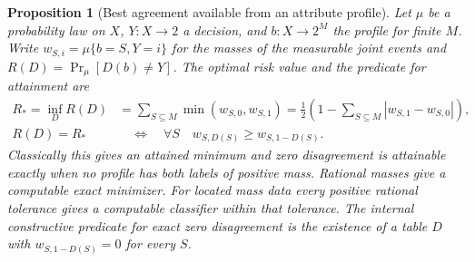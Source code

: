 \documentclass[11pt,a4paper]{article}
\newtheorem{proposition}[proposition]{Proposition}
\theoremstyle{definition}
\theoremstyle{remark}\newaliascnt{remark}{theorem}
\numberwithin{equation}{section}
\begin{document}
\begin{proposition}[Best agreement available from an attribute profile]\label{prop:profile-risk}
Let \(\mu\) be a probability law on \(X\), \(Y:X\to2\) a decision, and \(b:X\to2^M\) the profile for finite \(M\). Write \(w_{S,i}=\mu\{b=S,Y=i\}\) for the masses of the measurable joint events and \(R(D)=\Pr_\mu[D(b)\ne Y]\). The optimal risk value and the predicate for attainment are
\[
\begin{aligned}
 R_*=\inf_D R(D)
    &=\sum_{S\subseteq M}\min(w_{S,0},w_{S,1})
      =\tfrac12\!\left(1-\sum_{S\subseteq M}|w_{S,1}-w_{S,0}|\right),\\
 R(D)=R_*&\quad\Longleftrightarrow\quad
         \forall S\quad w_{S,D(S)}\ge w_{S,1-D(S)} .
\end{aligned}
\]
Classically this gives an attained minimum and zero disagreement is attainable exactly when no profile has both labels of positive mass. Rational masses give a computable exact minimizer. For located mass data every positive rational tolerance gives a computable classifier within that tolerance. The internal constructive predicate for exact zero disagreement is the existence of a table \(D\) with \(w_{S,1-D(S)}=0\) for every \(S\).
\end{proposition}
\end{document}
